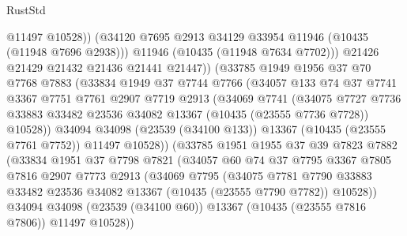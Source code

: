 \begin{lexlean}{RustStd}
\begin{coremodule}
                      @11497
                      @10528))
                  (@34120 @7695 @2913 @34129 @33954 @11946 (@10435 (@11948 @7696 @2938)))
                  @11946
                  (@10435 (@11948 @7634 @7702)))
                @21426
                @21429
                @21432
                @21436
                @21441
                @21447))
            (@33785
              @1949
              @1956
              @37
              @70
              @7768
              @7883
              (@33834
                @1949
                @37
                @7744
                @7766
                (@34057
                  @133
                  @74
                  @37
                  @7741
                  @3367
                  @7751
                  @7761
                  @2907
                  @7719
                  @2913
                  (@34069
                    @7741
                    (@34075
                      @7727
                      @7736
                      @33883
                      @33482
                      @23536
                      @34082
                      @13367
                      (@10435 (@23555 @7736 @7728))
                      @10528))
                  @34094
                  @34098
                  (@23539 (@34100 @133))
                  @13367
                  (@10435 (@23555 @7761 @7752))
                  @11497
                  @10528))
              (@33785
                @1951
                @1955
                @37
                @39
                @7823
                @7882
                (@33834
                  @1951
                  @37
                  @7798
                  @7821
                  (@34057
                    @60
                    @74
                    @37
                    @7795
                    @3367
                    @7805
                    @7816
                    @2907
                    @7773
                    @2913
                    (@34069
                      @7795
                      (@34075
                        @7781
                        @7790
                        @33883
                        @33482
                        @23536
                        @34082
                        @13367
                        (@10435 (@23555 @7790 @7782))
                        @10528))
                    @34094
                    @34098
                    (@23539 (@34100 @60))
                    @13367
                    (@10435 (@23555 @7816 @7806))
                    @11497
                    @10528))

\end{coremodule}
\end{lexlean}
